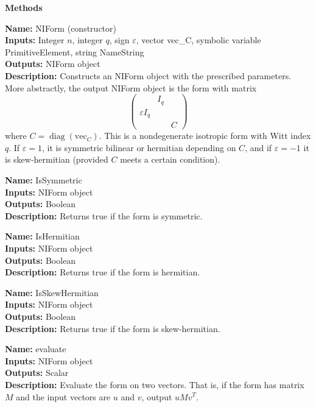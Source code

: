 \documentclass[12pt]{article}
\theoremstyle{definition}
\numberwithin{theorem}{subsection}
\newcommand{\eps}{\varepsilon}
\newcommand{\tbf}{\textbf}
\newcommand{\noi}{\noindent}
\DeclareMathOperator{\diag}{diag}
\begin{document}
\begin{center}
\tbf{Methods}
\end{center}

\begin{framed}
\noi \tbf{Name:} NIForm (constructor) \\
\noi \tbf{Inputs:} Integer $n$, integer $q$, sign $\eps$, vector vec\_C, symbolic variable PrimitiveElement, string NameString \\
\noi \tbf{Outputs:} NIForm object \\
\noi \tbf{Description:} Constructs an NIForm object with the prescribed parameters. More abstractly, the output NIForm object is the form with matrix
\[
	\begin{pmatrix}
		& I_q \\
		\eps I_q \\
		&& C
	\end{pmatrix}
\]
where $C = \diag(\text{vec}_C)$. This is a nondegenerate isotropic form with Witt index $q$. If $\eps = 1$, it is symmetric bilinear or hermitian depending on $C$, and if $\eps = -1$ it is skew-hermitian (provided $C$ meets a certain condition).
\end{framed}

\begin{framed}
\noi \tbf{Name:} IsSymmetric \\
\noi \tbf{Inputs:} NIForm object \\
\noi \tbf{Outputs:} Boolean \\
\noi \tbf{Description:} Returns true if the form is symmetric.
\end{framed}

\begin{framed}
\noi \tbf{Name:} IsHermitian \\
\noi \tbf{Inputs:}  NIForm object \\
\noi \tbf{Outputs:}  Boolean \\
\noi \tbf{Description:}  Returns true if the form is hermitian.
\end{framed}

\begin{framed}
\noi \tbf{Name:} IsSkewHermitian \\
\noi \tbf{Inputs:}  NIForm object \\
\noi \tbf{Outputs:}  Boolean \\
\noi \tbf{Description:}  Returns true if the form is skew-hermitian.
\end{framed}

\begin{framed}
\noi \tbf{Name:} evaluate \\
\noi \tbf{Inputs:} NIForm object \\
\noi \tbf{Outputs:} Scalar \\
\noi \tbf{Description:} Evaluate the form on two vectors. That is, if the form has matrix $M$ and the input vectors are $u$ and $v$, output $uMv^T$.
\end{framed}
\end{document}
